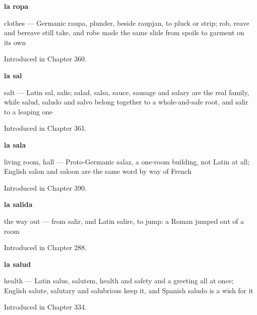 \noindent\begin{minipage}[t]{\linewidth}
\raggedright
\textbf{la ropa}\par
\small clothes — Germanic raupa, plunder, beside raupjan, to pluck or strip; rob, reave and bereave still take, and robe made the same slide from spoils to garment on its own\par
\footnotesize Introduced in Chapter 360.
\end{minipage}\par\medskip

\noindent\begin{minipage}[t]{\linewidth}
\raggedright
\textbf{la sal}\par
\small salt — Latin sal, salis; salad, salsa, sauce, sausage and salary are the real family, while salud, saludo and salvo belong together to a whole-and-safe root, and salir to a leaping one\par
\footnotesize Introduced in Chapter 361.
\end{minipage}\par\medskip

\noindent\begin{minipage}[t]{\linewidth}
\raggedright
\textbf{la sala}\par
\small living room, hall — Proto-Germanic salaz, a one-room building, not Latin at all; English salon and saloon are the same word by way of French\par
\footnotesize Introduced in Chapter 390.
\end{minipage}\par\medskip

\noindent\begin{minipage}[t]{\linewidth}
\raggedright
\textbf{la salida}\par
\small the way out — from salir, and Latin salire, to jump: a Roman jumped out of a room\par
\footnotesize Introduced in Chapter 288.
\end{minipage}\par\medskip

\noindent\begin{minipage}[t]{\linewidth}
\raggedright
\textbf{la salud}\par
\small health — Latin salus, salutem, health and safety and a greeting all at once; English salute, salutary and salubrious keep it, and Spanish saludo is a wish for it\par
\footnotesize Introduced in Chapter 334.
\end{minipage}\par\medskip

